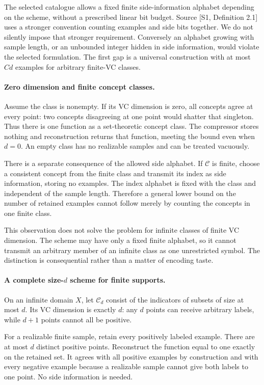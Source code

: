 \documentclass[11pt]{article}
\begin{document}
The selected catalogue allows a fixed finite side-information alphabet depending on the scheme, without a prescribed linear bit budget. Source [S1, Definition 2.1] uses a stronger convention counting examples and side bits together. We do not silently impose that stronger requirement. Conversely an alphabet growing with sample length, or an unbounded integer hidden in side information, would violate the selected formulation. The first gap is a universal construction with at most $Cd$ examples for arbitrary finite-VC classes.

\paragraph{Zero dimension and finite concept classes.}
Assume the class is nonempty. If its VC dimension is zero, all concepts agree at every point: two concepts disagreeing at one point would shatter that singleton. Thus there is one function as a set-theoretic concept class. The compressor stores nothing and reconstruction returns that function, meeting the bound even when $d=0$. An empty class has no realizable samples and can be treated vacuously.

There is a separate consequence of the allowed side alphabet. If $\mathcal C$ is finite, choose a consistent concept from the finite class and transmit its index as side information, storing no examples. The index alphabet is fixed with the class and independent of the sample length. Therefore a general lower bound on the number of retained examples cannot follow merely by counting the concepts in one finite class.

This observation does not solve the problem for infinite classes of finite VC dimension. The scheme may have only a fixed finite alphabet, so it cannot transmit an arbitrary member of an infinite class as one unrestricted symbol. The distinction is consequential rather than a matter of encoding taste.

\paragraph{A complete size-$d$ scheme for finite supports.}
On an infinite domain $X$, let $\mathcal C_d$ consist of the indicators of subsets of size at most $d$. Its VC dimension is exactly $d$: any $d$ points can receive arbitrary labels, while $d+1$ points cannot all be positive.

For a realizable finite sample, retain every positively labeled example. There are at most $d$ distinct positive points. Reconstruct the function equal to one exactly on the retained set. It agrees with all positive examples by construction and with every negative example because a realizable sample cannot give both labels to one point. No side information is needed.
\end{document}
